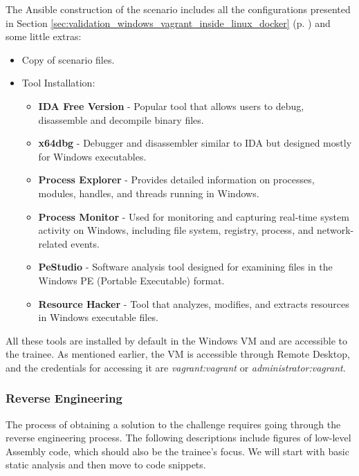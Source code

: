 The Ansible construction of the scenario includes all the configurations presented in Section \ref{sec:validation_windows_vagrant_inside_linux_docker} (p. \pageref{sec:validation_windows_vagrant_inside_linux_docker}) and some little extras:

\begin{itemize}
    \item Copy of scenario files.
    \item Tool Installation:
    \begin{itemize}
        \item \textbf{IDA Free Version} - Popular tool that allows users to debug, disassemble and decompile binary files.
        \item \textbf{x64dbg} - Debugger and disassembler similar to IDA but designed mostly for Windows executables.
        \item \textbf{Process Explorer} - Provides detailed information on processes, modules, handles, and threads running in Windows.
        \item \textbf{Process Monitor} - Used for monitoring and capturing real-time system activity on Windows, including file system, registry, process, and network-related events.
        \item \textbf{PeStudio} - Software analysis tool designed for examining files in the Windows PE (Portable Executable) format.
        \item \textbf{Resource Hacker} - Tool that analyzes, modifies, and extracts resources in Windows executable files.
    \end{itemize}
\end{itemize}

All these tools are installed by default in the Windows VM and are accessible to the trainee. As mentioned earlier, the VM is accessible through Remote Desktop, and the credentials for accessing it are \textit{vagrant:vagrant} or \textit{administrator:vagrant}.

\subsubsection{Reverse Engineering} \label{sec:validation_ransomware_solution}

The process of obtaining a solution to the challenge requires going through the reverse engineering process. The following descriptions include figures of low-level Assembly code, which should also be the trainee's focus. We will start with basic static analysis and then move to code snippets.


